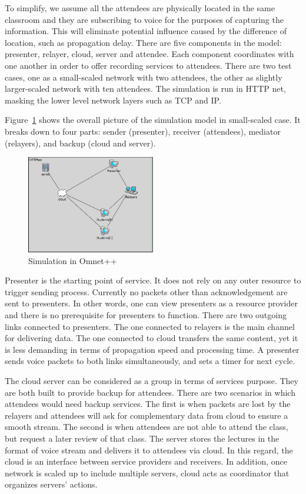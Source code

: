 To simplify, we assume all the attendees are physically located in the same 
classroom and they are subscribing to voice for the purposes of capturing the 
information. This will eliminate potential influence caused by the difference 
of 
location, such as propagation delay. There are five components in the model: 
presenter, relayer, cloud, server and attendee. Each component coordinates with 
one another in order to offer recording services to attendees. There are two 
test cases, one as a small-scaled network with two attendees, the other as 
slightly larger-scaled network with ten attendees. The simulation 
is run in HTTP net, 
masking the lower level network layers such as TCP and IP. 



Figure~\ref{fig:sce} shows the overall picture of the simulation model in 
small-scaled case. It 
breaks down to four  parts: sender (presenter), receiver (attendees), 
mediator (relayers), and backup (cloud and server). 

\begin{figure}[h!]  
  \centering
    \includegraphics[width=0.5\textwidth]{figures/sce.png}
  \caption{Simulation in Omnet++}
  \label{fig:sce}
\end{figure}

Presenter is the starting point of service. It does not rely on any outer 
resource to trigger sending process. Currently no packets other than 
acknowledgement are sent to presenters. In other words, one can view presenters 
as a resource provider and there is no prerequisite for presenters to function. 
There are two outgoing links connected to presenters. The one connected to 
relayers is the main channel for delivering data. The one connected to cloud 
transfers the same content, yet it is less demanding in terms of propagation 
speed and processing time. A presenter sends voice packets to both links 
simultaneously, and sets a timer for next cycle. 

The cloud server can be considered as a group in terms of services 
purpose. 
They 
are both built to provide backup for attendees. There are two scenarios in 
which 
attendees would need backup services. The first is when packets are lost by the 
relayers and attendees will ask for complementary data from cloud to ensure a 
smooth stream. The second is when attendees are not able to attend 
the 
class, but request a later review of that class. The server stores the 
lectures in the format of voice stream and delivers it to attendees via cloud. 
In this regard, the cloud is an interface between service providers and 
receivers. In addition, once network is scaled up to include multiple servers, 
cloud acts as coordinator that organizes servers’ actions. 

